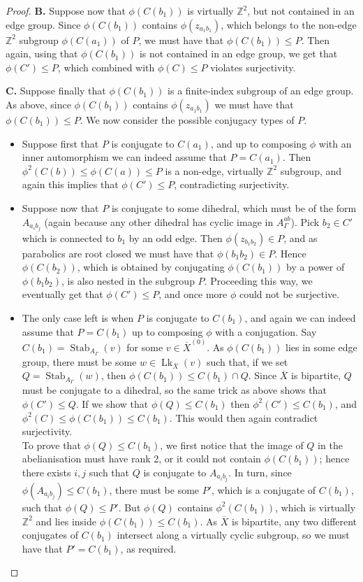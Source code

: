 \documentclass[10pt,a4paper]{amsart}
\theoremstyle{plain}
\newcommand{\Z}{\mathbb{Z}}
\newcommand{\ov}[1]{\overline{#1}}
\newcommand{\Stab}[2]{\operatorname{Stab}_{#1}(#2)}
\newcommand{\link}{\operatorname{Lk}}
\begin{document}
\begin{proof}
\par\medskip
    \textbf{B.}
    Suppose now that $\phi(C(b_1))$ is virtually $\Z^2$, but not contained in an edge group. Since $\phi(C(b_1))$ contains $\phi(z_{a_1b_1})$, which belongs to the non-edge $\Z^2$ subgroup $\phi(C(a_1))$ of $P$, we must have that $\phi(C(b_1))\le P$. Then again, using that $\phi(C(b_1))$ is not contained in an edge group, we get that $\phi(C')\le P$, which combined with $\phi(C)\le P$ violates surjectivity.
    \par\medskip
    \textbf{C.}
    Suppose finally that $\phi(C(b_1))$ is a finite-index subgroup of an edge group. As above, since $\phi(C(b_1))$ contains $\phi(z_{a_1b_1})$ we must have that $\phi(C(b_1))\le P$. We now consider the possible conjugacy types of $P$.
    \begin{itemize}
        \item Suppose first that $P$ is conjugate to $C(a_1)$, and up to composing $\phi$ with an inner automorphism we can indeed assume that $P=C(a_1)$. Then $\phi^2(C(b))\le \phi(C(a))\le P$ is a non-edge, virtually $\Z^2$ subgroup, and again this implies that $\phi(C')\le P$, contradicting surjectivity.
        \item Suppose now that $P$ is conjugate to some dihedral, which must be of the form $A_{a_ib_j}$ (again because any other dihedral has cyclic image in $A_\Gamma^{ab}$). Pick $b_2\in C'$ which is connected to $b_1$ by an odd edge. Then $\phi(z_{b_1b_2})\in P$, and as parabolics are root closed we must have that $\phi(b_1b_2)\in P$. Hence $\phi(C(b_2))$, which is obtained by conjugating $\phi(C(b_1))$ by a power of $\phi(b_1b_2)$, is also nested in the subgroup $P$. Proceeding this way, we eventually get that $\phi(C')\le P$, and once more $\phi$ could not be surjective. 
        \item The only case left is when $P$ is conjugate to $C(b_1)$, and again we can indeed assume that $P=C(b_1)$ up to composing $\phi$ with a conjugation. Say $C(b_1)=\Stab{A_\Gamma}{v}$ for some $v\in \ov X^{(0)}$. As $\phi(C(b_1))$ lies in some edge group, there must be some $w\in\link_{\ov X}(v)$ such that, if we set $Q=\Stab{A_\Gamma}{w}$, then $\phi(C(b_1))\le C(b_1)\cap Q$. Since $\ov X$ is bipartite, $Q$ must be conjugate to a dihedral, so the same trick as above shows that $\phi(C')\le Q$. If we show that $\phi(Q)\le C(b_1)$ then $\phi^2(C')\le C(b_1)$, and $\phi^2(C)\le \phi(C(b_1))\le C(b_1)$. This would then again contradict surjectivity. 
        \\
        To prove that $\phi(Q)\le C(b_1)$, we first notice that the image of $Q$ in the abelianisation must have rank 2, or it could not contain $\phi(C(b_1))$; hence there exists $i,j$ such that $Q$ is conjugate to $A_{a_ib_j}$. In turn, since $\phi(A_{a_ib_j})\le C(b_1)$, there must be some $P'$, which is a conjugate of $C(b_1)$, such that $\phi(Q)\le P'$. But $\phi(Q)$ contains $\phi^2(C(b_1))$, which is virtually $\Z^2$ and lies inside $\phi(C(b_1))\le C(b_1)$. As $\ov X$ is bipartite, any two different conjugates of $C(b_1)$ intersect along a virtually cyclic subgroup, so we must have that $P'=C(b_1)$, as required.

\end{itemize}
\end{proof}
\end{document}
